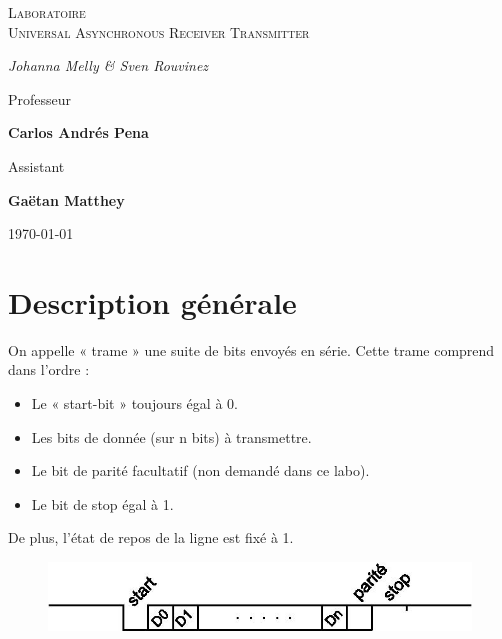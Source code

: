\documentclass[a4paper]{article} %
\begin{document}
\begin{titlepage}
	\centering
	
	{\scshape\LARGE \color{Monokaimagenta} Laboratoire \\ Universal Asynchronous Receiver Transmitter \par}
	
	\vspace{1cm}
	
	{\Large\itshape Johanna Melly \& Sven Rouvinez\par}
	
	\vfill
	Professeur\par
	\textbf{Carlos Andrés Pena} \par%
	\vspace{1cm}
	Assistant\par
	\textbf{Gaëtan Matthey}
	
	\vfill

	{\large \today\par}
	
\end{titlepage}

\section{Description générale}
On appelle « trame » une suite de bits envoyés en série. Cette trame comprend dans l’ordre :
\begin{itemize}
\item Le « start-bit » toujours égal à 0.
\item Les bits de donnée (sur n bits) à transmettre.
\item Le bit de parité facultatif (non demandé dans ce labo).
\item Le bit de stop égal à 1.
\end{itemize}
De plus, l’état de repos de la ligne est fixé à 1.
\\ 
\begin{figure}[H]
    \centering
    \includegraphics[width=.8\textwidth]{src/uart_1.jpg}
    \label{fig:trame}
\end{figure}
\end{document}
